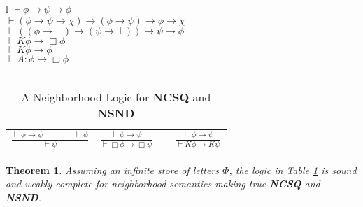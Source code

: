 \documentclass{article}
\newcommand{\tmstrong}[1]{\textbf{#1}}
\newcommand{\tmtextbf}[1]{{\bfseries{#1}}}
\newtheorem{theorem}{Theorem}
\begin{document}
\begin{table}[h]
  \begin{tabular}{l}
    $\vdash \phi \rightarrow \psi \rightarrow \phi$\\
    $\vdash (\phi \rightarrow \psi \rightarrow \chi) \rightarrow (\phi
    \rightarrow \psi) \rightarrow \phi \rightarrow \chi$\\
    $\vdash ((\phi \rightarrow \bot) \rightarrow (\psi \rightarrow \bot))
    \rightarrow \psi \rightarrow \phi$\\
    $\vdash K \phi \rightarrow \Box \phi$\\
    $\vdash K \phi \rightarrow \phi$\\
    $\vdash A : \phi \rightarrow \Box \phi$\\
    \\
    \begin{tabular}{llll}
      $\frac{\vdash \phi \rightarrow \psi \hspace{4em} \vdash \phi}{\vdash
      \psi}$ & {\hspace{6em}}$\frac{\vdash \phi \rightarrow \psi}{\vdash \Box
      \phi \rightarrow \Box \psi}$ & {\hspace{6em}} & $\frac{\vdash \phi
      \rightarrow \psi}{\vdash K \phi \rightarrow K \psi}$
    \end{tabular}
  \end{tabular}
  \caption{\label{logic3}A Neighborhood Logic for \tmtextbf{NCSQ} and
  {\tmstrong{NSND}}}
\end{table}

\begin{theorem}
  Assuming an infinite store of letters $\Phi$, the logic in Table
  \ref{logic3} is sound and weakly complete for neighborhood semantics making
  true \tmtextbf{NCSQ} and \tmtextbf{NSND}.
\end{theorem}
\end{document}
